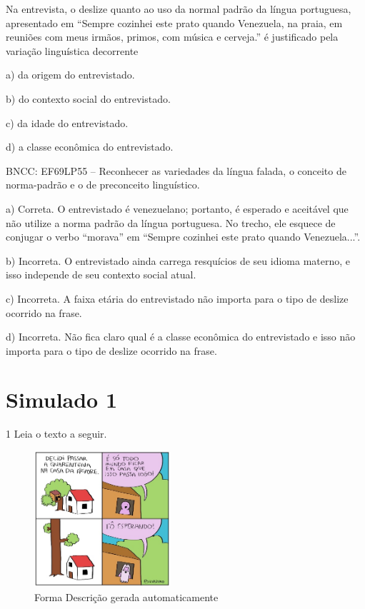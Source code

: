 Na entrevista, o deslize quanto ao uso da normal padrão da língua
portuguesa, apresentado em ``Sempre cozinhei este prato quando
Venezuela, na praia, em reuniões com meus irmãos, primos, com música e
cerveja.'' é justificado pela variação linguística decorrente

a) da origem do entrevistado.

b) do contexto social do entrevistado.

c) da idade do entrevistado.

d) a classe econômica do entrevistado.

BNCC: EF69LP55 -- Reconhecer as variedades da língua falada, o conceito
de norma-padrão e o de preconceito linguístico.

a) Correta. O entrevistado é venezuelano; portanto, é esperado e
aceitável que não utilize a norma padrão da língua portuguesa. No
trecho, ele esquece de conjugar o verbo ``morava'' em ``Sempre cozinhei
este prato quando Venezuela...''.

b) Incorreta. O entrevistado ainda carrega resquícios de seu idioma
materno, e isso independe de seu contexto social atual.

c) Incorreta. A faixa etária do entrevistado não importa para o tipo de
deslize ocorrido na frase.

d) Incorreta. Não fica claro qual é a classe econômica do entrevistado e
isso não importa para o tipo de deslize ocorrido na frase.

\hypertarget{simulado-1}{%
\section{Simulado 1}\label{simulado-1}}

\num{1} Leia o texto a seguir.

\begin{figure}
\centering
\includegraphics[width=1.98077in,height=1.98077in]{./imgSAEB_6_POR/media/image34.jpeg}
\caption{Forma Descrição gerada automaticamente}
\end{figure}


